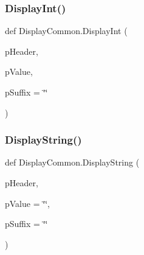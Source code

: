 \mbox{\label{namespace_display_common_a3389e08fe0ba868c01bf5f3831086578}} 
\subsubsection{\texorpdfstring{Display\+Int()}{DisplayInt()}}
{\footnotesize\ttfamily def Display\+Common.\+Display\+Int (\begin{DoxyParamCaption}\item[{}]{p\+Header,  }\item[{}]{p\+Value,  }\item[{}]{p\+Suffix = {\ttfamily \char`\"{}\char`\"{}} }\end{DoxyParamCaption})}

\mbox{\label{namespace_display_common_aac12070f940253478cc76bc2d44ad15f}} 
\subsubsection{\texorpdfstring{Display\+String()}{DisplayString()}}
{\footnotesize\ttfamily def Display\+Common.\+Display\+String (\begin{DoxyParamCaption}\item[{}]{p\+Header,  }\item[{}]{p\+Value = {\ttfamily \char`\"{}\char`\"{}},  }\item[{}]{p\+Suffix = {\ttfamily \char`\"{}\char`\"{}} }\end{DoxyParamCaption})}

